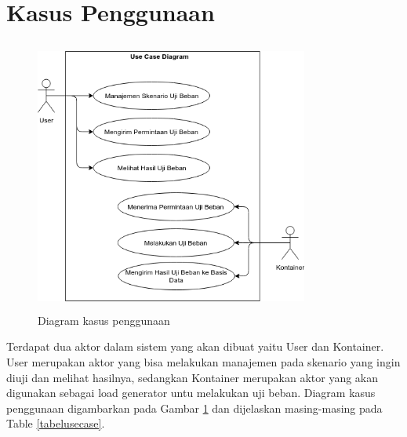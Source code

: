     \section{Kasus Penggunaan}
	    \begin{figure}[H]
	    	\centering
	    	\includegraphics[width=9cm,height=9cm]{Images/C-3/usecasediagram.png}
	    	\caption{Diagram kasus penggunaan}
	    	\label{usecased}
	    \end{figure}
    	Terdapat dua aktor dalam sistem yang akan dibuat yaitu User dan Kontainer. User merupakan aktor yang bisa melakukan manajemen pada skenario yang ingin diuji dan melihat hasilnya, sedangkan Kontainer merupakan aktor yang akan digunakan sebagai load generator untu melakukan uji beban. Diagram kasus penggunaan digambarkan pada Gambar \ref{usecased} dan dijelaskan masing-masing pada Table \ref{tabelusecase}.
    	
